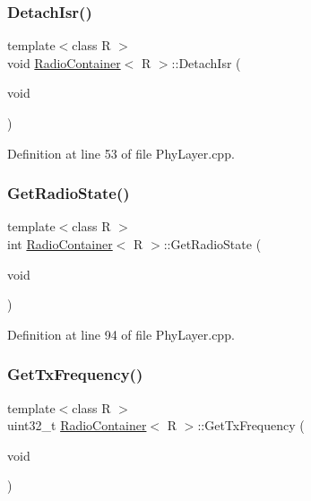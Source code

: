 \subsubsection{\texorpdfstring{Detach\+Isr()}{DetachIsr()}}
{\footnotesize\ttfamily template$<$class R $>$ \\
void \mbox{\hyperlink{class_radio_container}{Radio\+Container}}$<$ R $>$\+::Detach\+Isr (\begin{DoxyParamCaption}\item[{void}]{ }\end{DoxyParamCaption})}



Definition at line 53 of file Phy\+Layer.\+cpp.

\mbox{\label{class_radio_container_a3ffe014538d877752663a6f747247554}} 
\subsubsection{\texorpdfstring{Get\+Radio\+State()}{GetRadioState()}}
{\footnotesize\ttfamily template$<$class R $>$ \\
int \mbox{\hyperlink{class_radio_container}{Radio\+Container}}$<$ R $>$\+::Get\+Radio\+State (\begin{DoxyParamCaption}\item[{void}]{ }\end{DoxyParamCaption})}



Definition at line 94 of file Phy\+Layer.\+cpp.

\mbox{\label{class_radio_container_a59cf65c721a176fdd0cf2d0039a18242}} 
\subsubsection{\texorpdfstring{Get\+Tx\+Frequency()}{GetTxFrequency()}}
{\footnotesize\ttfamily template$<$class R $>$ \\
uint32\+\_\+t \mbox{\hyperlink{class_radio_container}{Radio\+Container}}$<$ R $>$\+::Get\+Tx\+Frequency (\begin{DoxyParamCaption}\item[{void}]{ }\end{DoxyParamCaption})}



